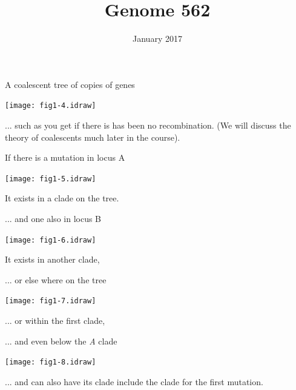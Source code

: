 \documentclass[bluish,slideColor,colorBG,pdf]{prosper}
\author{January 2017}
\title{Genome 562}
\begin{document}
\maketitle

\begin{slide}[Replace]{A coalescent tree of copies of genes}

\centerline{\texttt{[image: fig1-4.idraw]}}

... such as you get if there is has been no recombination.
(We will discuss the theory of coalescents much later in the course).

\end{slide}

\begin{slide}[Replace]{If there is a mutation in locus A }

\centerline{\texttt{[image: fig1-5.idraw]}}

It exists in a clade on the tree.

\end{slide}

\begin{slide}[Replace]{ ... and one also in locus B }

\centerline{\texttt{[image: fig1-6.idraw]}}

It exists in another clade,

\end{slide}

\begin{slide}[Replace]{ ... or else where on the tree}

\centerline{\texttt{[image: fig1-7.idraw]}}

... or within the first clade,

\end{slide}

\begin{slide}[Replace]{ ... and even below the {\it A} clade}

\centerline{\texttt{[image: fig1-8.idraw]}}

... and can also have its clade include the clade for the first mutation.

\end{slide}
\end{document}
